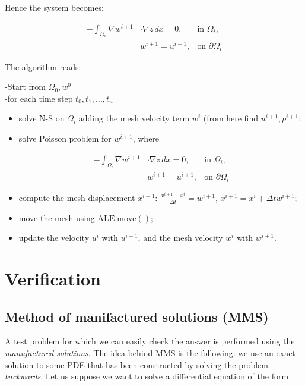 \documentclass[11pt,a4paper,titlepage]{report}
\begin{document}
Hence the system becomes:

\[
\begin{aligned}
-  \int_{\Omega_i} \nabla w^{i+1} & \cdot \nabla z \, dx = 0, & \text{in } \Omega_i, \\
& w^{i+1} = u^{i+1}, & \text{on } \partial \Omega_i
\end{aligned}
\]

The algorithm reads:

-Start from $\Omega_0, w^0$ \\
-for each time step $t_0, t_1, ..., t_n$
\begin{itemize}
\item solve N-S on $\Omega_i$ adding the mesh velocity term $w^i$ (from here find $u^{i+1}, p^{i+1}$;
\item solve Poisson problem for $w^{i+1}$, where 

\[
\begin{aligned}
-  \int_{\Omega_i} \nabla w^{i+1} & \cdot \nabla z \, dx = 0, & \text{in } \Omega_i, \\
& w^{i+1} = u^{i+1}, & \text{on } \partial \Omega_i
\end{aligned}
\]

\item compute the mesh displacement $x^{i+1}$: $\frac{x^{i+1} - x^{i}}{\Delta t} = w^{i+1}$, $x^{i+1} = x^{i} + \Delta t w^{i+1}$;
\item move the mesh using $\mathrm{ALE.move()}$;
\item update the velocity $u^i$ with $u^{i+1}$, and the mesh velocity $w^i$ with $w^{i+1}$.

\end{itemize}


\chapter{Verification}

\section{Method of manifactured solutions (MMS)}

A test problem for which we can easily check the answer is performed using the \textit{manufactured solutions}. The idea behind MMS is the following: we use an exact solution to some PDE that has been constructed by solving the problem \textit{backwards}. Let us suppose we want to solve a differential equation of the form 
\end{document}

